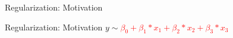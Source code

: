 \documentclass[8pt]{beamer}
\begin{document}
    \begin{frame}{Regularization: Motivation}
        \centering
        \vfill
        \vfill
    \end{frame}

    \begin{frame}{Regularization: Motivation}
        \centering
        \vfill
        $y \sim$\textcolor{red} {$ \beta_0 + \beta_1 * x_1 + \beta_2 * x_2 + \beta_3 * x_3$}
        \vfill
    \end{frame}
\end{document}

